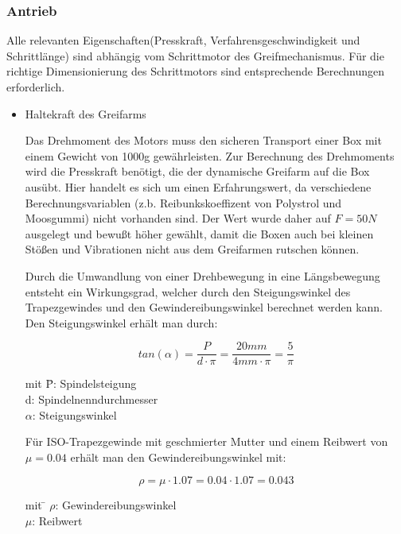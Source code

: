 \documentclass{scrartcl}
\begin{document}
\subsubsection{Antrieb}

Alle relevanten Eigenschaften(Presskraft, Verfahrensgeschwindigkeit und Schrittlänge) sind abhängig vom Schrittmotor 
des Greifmechanismus. Für die richtige Dimensionierung des Schrittmotors sind entsprechende Berechnungen erforderlich.

\begin{itemize}

\item Haltekraft des Greifarms

Das Drehmoment des Motors muss den sicheren Transport einer Box mit einem Gewicht von 1000g gewährleisten. Zur Berechnung des Drehmoments wird die Presskraft benötigt, die der dynamische Greifarm auf die Box ausübt. Hier handelt es sich um einen Erfahrungswert, da verschiedene Berechnungsvariablen (z.b. Reibunkskoeffizent von Polystrol und Moosgummi) nicht vorhanden sind. Der Wert wurde daher auf $F=50N$ ausgelegt und bewußt höher gewählt, damit die Boxen auch bei kleinen Stößen und Vibrationen nicht aus dem Greifarmen rutschen können.\\
\newline

Durch die Umwandlung von einer Drehbewegung in eine Längsbewegung entsteht ein Wirkungsgrad, welcher durch den 
Steigungswinkel des Trapezgewindes und den Gewindereibungswinkel berechnet werden kann.\\

Den Steigungswinkel erhält man durch:

\[tan(\alpha)=\dfrac{P}{d\cdot \pi}=\dfrac{20mm}{4mm\cdot \pi}=\dfrac{5}{\pi}\]

\begin{tabbing}
mit \= P: Spindelsteigung\\
    \> d: Spindelnenndurchmesser  \\
		\> $\alpha$: Steigungswinkel\\
\end{tabbing}

Für ISO-Trapezgewinde mit geschmierter Mutter und einem Reibwert von $\mu=0.04$ erhält man den Gewindereibungswinkel mit:

\[ \rho=\mu\cdot 1.07= 0.04\cdot 1.07=0.043 \]

\begin{tabbing}
mit \= $\rho$: Gewindereibungswinkel\\
    \> $\mu$: Reibwert  \\
\end{tabbing}


\end{itemize}
\end{document}
